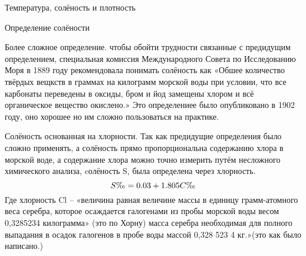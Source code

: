 \begin{chapter}{Температура, солёность и плотность}
\begin{section}{Определение солёности}
\begin{paragraph}{Более сложное определение.}
чтобы обойти трудности связанные с предидущим определением,
специальная комиссия Международного Совета по Исследованию Моря в 1889
году рекомендовала понимать солёность как «Обшее количество твёрдых
вещкств в граммах на килограмм морской воды при условии, что все
карбонаты переведены в оксиды, бром и йод замещены хлором и всё
органическое вещество окислено.» Это определениее было опубликовано в
1902 году, оно хорошее но им сложно пользоваться на практике.
%
\end{paragraph}

\begin{paragraph}{Солёность основанная на хлорности.}
Так как предидущие определения было сложно применять, а солёность
прямо пропорциональна содержанию хлора в морской воде, а содержание
хлора можно точно измерить путём несложного химического анализа,
cолёность S, была определена через хлорность.
\begin{equation}
S\ppt = 0.03 + 1.805C\ppt
\end{equation}
Где хлорность Cl – «величина равная величине массы в единицу
грамм-атомного веса серебра, которое осаждается галогенами из пробы
морской воды весом 0,3285234 килограмма» (это по Хорну) масса серебра
необходимая для полного выпадания в осадок галогенов в пробе воды
массой 0,328 523 4 кг.»(это как было написано.)
%


\end{paragraph}
\end{section}
\end{chapter}
